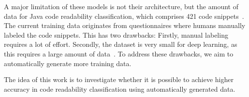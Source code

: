 \documentclass[%
class=scrreprt,
chapterprefix=false,%
open=right,%
twoside=true,%
paper=a4,%
logofile={Logo\_zentral\_farbig\_EN.png},%
thesistype=master,%
UKenglish,%
]{se2thesis}
\theoremstyle{definition}
\newcommand{\citeolddataset}{\cite{buse2009learning, dorn2012general, scalabrino2018comprehensive}\xspace}
\begin{document}
	A major limitation of these models is not their architecture, but the amount of data for Java code readability classification, which comprises 421 code snippets~\citeolddataset. The current training data originates from questionnaires where humans manually labeled the code snippets. This has two drawbacks: Firstly, manual labeling requires a lot of effort.
	Secondly, the dataset is very small for deep learning, as this requires a large amount of data~\cite{hestness2017deep}.
	To address these drawbacks, we aim to automatically generate more training data.
	
	
	The idea of this work is to investigate whether it is possible to achieve higher accuracy in code readability classification using automatically generated data. 
	
\end{document}
